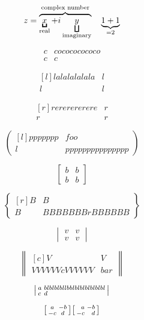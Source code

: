 \documentclass{article}
\newcommand{\horz}{\noindent\makebox[\linewidth]{\rule{\paperwidth}{0.4pt}}}
\begin{document}
\horz

\[
z = \LaTeXoverbrace{
   \underbracket{x}_\text{real} + i
      \underbracket[1pt][7pt]{y}_\text{imaginary}
        }^\text{complex number}
\quad
\underbrace{1+1}_{=2}
\]

\horz

\[
\begin{matrix*}
c & cocococococo \\
c & c
\end{matrix*}
\]

\[
\begin{matrix*}[l]
lalalalalala & l \\
l & l
\end{matrix*}
\]

\[
\begin{matrix*}[r]
rererererere & r \\
r & r
\end{matrix*}
\]

\horz

\[
\begin{pmatrix*}[l]
ppppppp & foo \\
l & ppppppppppppppp
\end{pmatrix*}
\]

\[
\begin{bmatrix*}
b & b \\
b & b
\end{bmatrix*}
\]

\[
\begin{Bmatrix*}[r]
B & B \\
B & BBBBBBBrBBBBBB
\end{Bmatrix*}
\]

\[
\begin{vmatrix*}
v & v \\
v & v
\end{vmatrix*}
\]

\[
\begin{Vmatrix*}[c]
V & V \\
VVVVVVcVVVVVV & bar
\end{Vmatrix*}
\]

\horz

\[
\begin{vsmallmatrix*}[l]
a & blblblbllbblblblblblblbl \\
c & d
\end{vsmallmatrix*}
\]

\[
\begin{bsmallmatrix} a & -b \\ -c & d \end{bsmallmatrix}
\begin{bsmallmatrix*}[r] a & -b \\ -c & d \end{bsmallmatrix*}
\]
\end{document}
